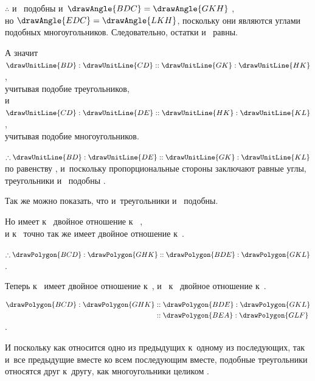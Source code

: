 \documentclass[letters,booklanguage=russian]{byrnebook}
\begin{document}
\begin{center}
$\therefore$  и~ подобны и~$\drawAngle{BDC} = \drawAngle{GKH}$ ,\\
но $\drawAngle{EDC} = \drawAngle{LKH}$, поскольку они являются углами подобных многоугольников. Следовательно, остатки  и~ равны.

А значит $\drawUnitLine{BD} : \drawUnitLine{CD} :: \drawUnitLine{GK} : \drawUnitLine{HK}$,\\
учитывая подобие треугольников,\\
и $\drawUnitLine{CD} : \drawUnitLine{DE} :: \drawUnitLine{HK} : \drawUnitLine{KL}$,\\
учитывая подобие многоугольников.

$\therefore \drawUnitLine{BD} : \drawUnitLine{DE} :: \drawUnitLine{GK} : \drawUnitLine{KL}$\\
по равенству , и~поскольку пропорциональные стороны заключают равные углы, треугольники  и~ подобны .

Так же можно показать, что и~треугольники  и~ подобны.

Но  имеет к~ двойное отношение  к~ ,\\
и  к~ точно так же имеет двойное отношение  к~.

$\therefore \drawPolygon{BCD} : \drawPolygon{GHK} :: \drawPolygon{BDE} : \drawPolygon{GKL}$ .

Теперь  к~ имеет двойное отношение  к~, и~ к~ двойное отношение  к~.

$\begin{aligned}
	\drawPolygon{BCD} : \drawPolygon{GHK} &:: \drawPolygon{BDE} : \drawPolygon{GKL} \\
	&:: \drawPolygon{BEA} : \drawPolygon{GLF} \\
\end{aligned}$.
\end{center}

И поскольку как относится одно из предыдущих к~одному из последующих, так и~все предыдущие вместе ко всем последующим вместе, подобные треугольники относятся друг к~другу, как многоугольники целиком .
\end{document}

